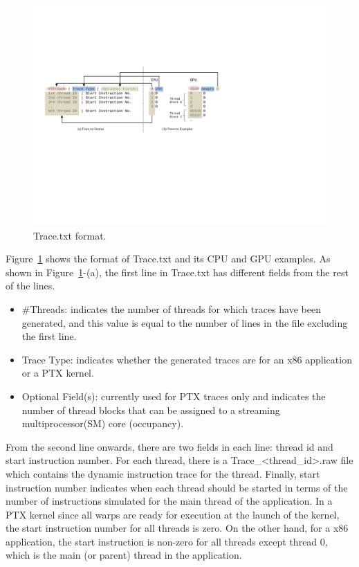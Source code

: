 \begin{figure}[htb]
\centering
\includegraphics{figs/trace_format}
\caption{Trace.txt format.}
\label{fig:trace_format}
\end{figure}


Figure~\ref{fig:trace_format} shows the format of Trace.txt and its CPU and GPU
examples.  As shown in Figure~\ref{fig:trace_format}-(a), the first line in
Trace.txt has different fields from the rest of the lines.

\begin{itemize}\itemsep2pt
\item \#Threads: indicates the number of threads for which traces have been generated, and this value 
is equal to the number of lines in the file excluding the first line.
\item Trace Type: indicates whether the generated traces are for an x86 application or a PTX kernel.
\item Optional Field(s): currently used for PTX traces only and indicates the number of thread blocks
that can be assigned to a streaming multiprocessor(SM) core (occupancy).
\end{itemize}

From the second line onwards, there are two fields in each line: thread id and
start instruction number. For each thread, there is a Trace\_<thread\_id>.raw
file which contains the dynamic instruction trace for the thread. Finally,
     start instruction number indicates when each thread should be started in
     terms of the number of instructions simulated for the main thread of the
     application. In a PTX kernel since all warps are ready for execution at
     the launch of the kernel, the start instruction number for all threads is
     zero. On the other hand, for a x86 application, the start instruction is
     non-zero for all threads except thread 0, which is the main (or parent)
  thread in the application.

